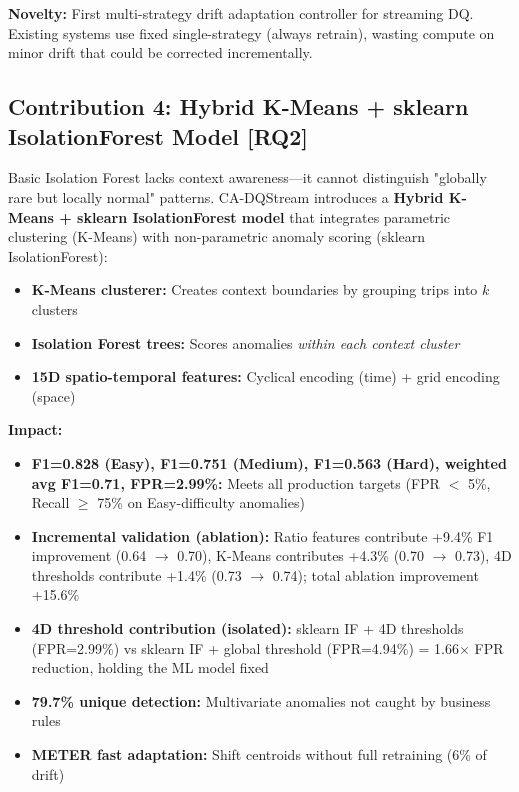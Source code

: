 \textbf{Novelty:} First multi-strategy drift adaptation controller for streaming DQ. Existing systems use fixed single-strategy (always retrain), wasting compute on minor drift that could be corrected incrementally.

\subsection{Contribution 4: Hybrid K-Means + sklearn IsolationForest Model [RQ2]}

Basic Isolation Forest lacks context awareness---it cannot distinguish "globally rare but locally normal" patterns. CA-DQStream introduces a \textbf{Hybrid K-Means + sklearn IsolationForest model} that integrates parametric clustering (K-Means) with non-parametric anomaly scoring (sklearn IsolationForest):

\begin{itemize}
    \item \textbf{K-Means clusterer:} Creates context boundaries by grouping trips into $k$ clusters
    \item \textbf{Isolation Forest trees:} Scores anomalies \emph{within each context cluster}
    \item \textbf{15D spatio-temporal features:} Cyclical encoding (time) + grid encoding (space)
\end{itemize}

\textbf{Impact:}
\begin{itemize}
    \item \textbf{F1=0.828 (Easy), F1=0.751 (Medium), F1=0.563 (Hard), weighted avg F1=0.71, FPR=2.99\%:} Meets all production targets (FPR $<$ 5\%, Recall $\geq$ 75\% on Easy-difficulty anomalies)
    \item \textbf{Incremental validation (ablation):} Ratio features contribute +9.4\% F1 improvement (0.64 $\to$ 0.70), K-Means contributes +4.3\% (0.70 $\to$ 0.73), 4D thresholds contribute +1.4\% (0.73 $\to$ 0.74); total ablation improvement +15.6\%
    \item \textbf{4D threshold contribution (isolated):} sklearn IF + 4D thresholds (FPR=2.99\%) vs sklearn IF + global threshold (FPR=4.94\%) = 1.66$\times$ FPR reduction, holding the ML model fixed
    \item \textbf{79.7\% unique detection:} Multivariate anomalies not caught by business rules
    \item \textbf{METER fast adaptation:} Shift centroids without full retraining (6\% of drift)
\end{itemize}

